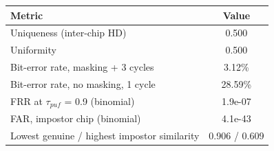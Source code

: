 \begin{tabular}{lc}
\toprule
Metric & Value \\
\midrule
Uniqueness (inter-chip HD) & 0.500 \\
Uniformity & 0.500 \\
Bit-error rate, masking + 3 cycles & 3.12\% \\
Bit-error rate, no masking, 1 cycle & 28.59\% \\
FRR at $\tau_{puf}$ = 0.9 (binomial) & 1.9e-07 \\
FAR, impostor chip (binomial) & 4.1e-43 \\
Lowest genuine / highest impostor similarity & 0.906 / 0.609 \\
\bottomrule
\end{tabular}

